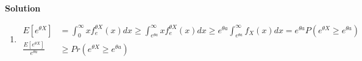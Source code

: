 \documentclass[11pt]{article}
\newcommand\TheSolution{%
  \textbf{Solution}\:\:%
}
\begin{document}
  \TheSolution
  \begin{enumerate}
  \item
    \begin{align}
      E[e^{\theta{}X}] &= \int_0^\infty xf_e^{\theta{}X}(x)dx \geq \int_{e^{\theta{}a}}^\infty xf_e^{\theta{}X}(x)dx \geq {e^{\theta{}a}} \int_{e^{\theta{}a}}^\infty f_X(x)dx = {e^{\theta{}a}}P(e^{\theta{}X}\geq {e^{\theta{}a}}) \\
      \frac{E[e^{\theta{}X}]}{{e^{\theta{}a}}} &\geq Pr(e^{\theta{}X} \geq {e^{\theta{}a}})
    \end{align}
  \end{enumerate}
\end{document}
